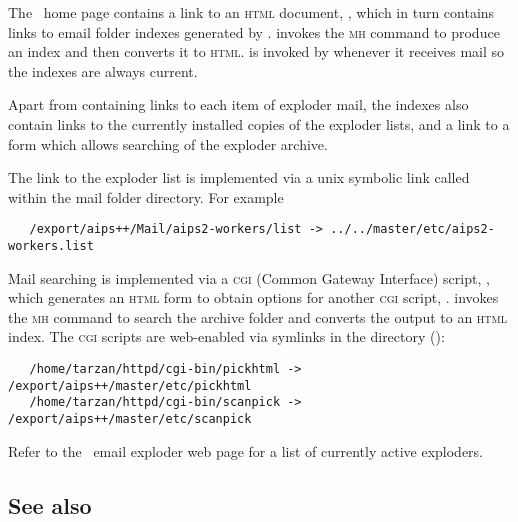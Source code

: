 \noindent
The \aipspp\ home page contains a link to an \textsc{html} document,
, which in turn contains links to email
folder indexes generated by .   invokes the
\textsc{mh}  command to produce an index and then converts it to
\textsc{html}.   is invoked by  whenever
it receives mail so the indexes are always current.

Apart from containing links to each item of exploder mail, the indexes also
contain links to the currently installed copies of the exploder lists, and a
link to a form which allows searching of the exploder archive.

The link to the exploder list is implemented via a unix symbolic link called
 within the mail folder directory.  For example

\begin{verbatim}
   /export/aips++/Mail/aips2-workers/list -> ../../master/etc/aips2-workers.list
\end{verbatim}

Mail searching is implemented via a \textsc{cgi} (Common Gateway Interface)
script, , which generates an \textsc{html} form to obtain
options for another \textsc{cgi} script, .  
invokes the \textsc{mh}  command to search the archive folder
and converts the  output to an \textsc{html} index.  The
\textsc{cgi} scripts are web-enabled via symlinks in the 
 directory ():

\begin{verbatim}
   /home/tarzan/httpd/cgi-bin/pickhtml -> /export/aips++/master/etc/pickhtml
   /home/tarzan/httpd/cgi-bin/scanpick -> /export/aips++/master/etc/scanpick
\end{verbatim}

Refer to the \aipspp\ email exploder web page for a list of currently active
exploders.

\subsection*{See also}

